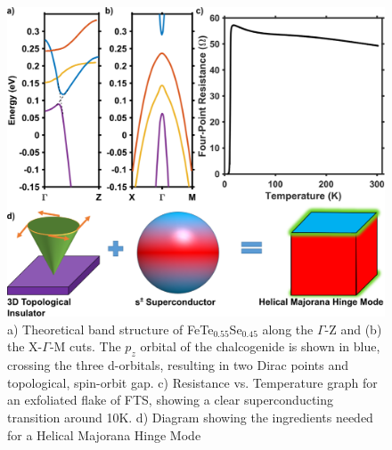 \begin{figure}
    \centering
    \includegraphics[width=\textwidth]{Chap3/Figures/F1V1.pdf}
    \caption{a) Theoretical band structure of FeTe$_{0.55}$Se$_{0.45}$ along the $\Gamma$-Z and (b) the X-$\Gamma$-M cuts\cite{Wang2015}. The $p_{z}$ orbital of the chalcogenide is shown in blue, crossing the three d-orbitals, resulting in two Dirac points and topological, spin-orbit gap. c) Resistance vs. Temperature graph for an exfoliated flake of FTS, showing a clear superconducting transition around 10K. d) Diagram showing the ingredients needed for a Helical Majorana Hinge Mode}
    \label{HingeTheory}
\end{figure}




